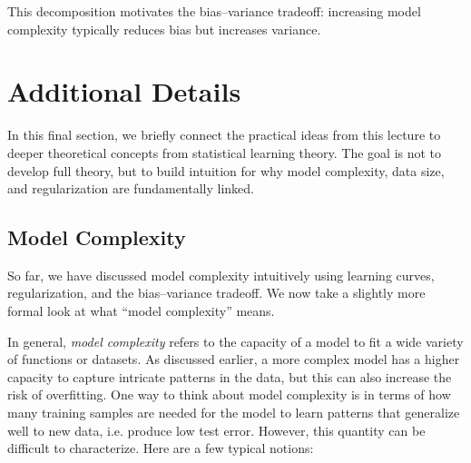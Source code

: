 \documentclass{article}
\begin{document}
This decomposition motivates the bias–variance tradeoff: increasing model complexity typically reduces bias but increases variance.





\section{Additional Details}

In this final section, we briefly connect the practical ideas from this lecture 
to deeper theoretical concepts from statistical learning theory. The goal is not 
to develop full theory, but to build intuition for why model complexity, data size, 
and regularization are fundamentally linked.

\subsection{Model Complexity}
So far, we have discussed model complexity intuitively using learning curves, 
regularization, and the bias–variance tradeoff. We now take a slightly more 
formal look at what “model complexity” means.

In general, \textit{model complexity} refers to the capacity of a model to fit a wide variety of functions or datasets. As discussed earlier, a more complex model has a higher capacity to capture intricate patterns in the data, but this can also increase the risk of overfitting. One way to think about model complexity is in terms of how many training samples are needed for the model to learn patterns that generalize well to new data, i.e. produce low test error. However, this quantity can be difficult to characterize. Here are a few typical notions:
\end{document}
